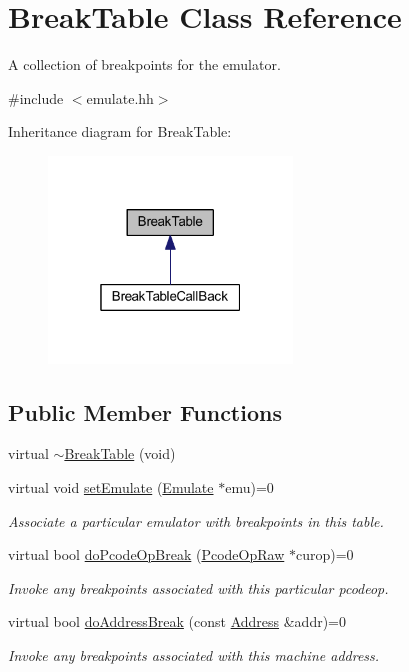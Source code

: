 \hypertarget{class_break_table}{}\section{Break\+Table Class Reference}
\label{class_break_table}


A collection of breakpoints for the emulator.  




{\ttfamily \#include $<$emulate.\+hh$>$}



Inheritance diagram for Break\+Table\+:
\nopagebreak
\begin{figure}[H]
\begin{center}
\leavevmode
\includegraphics[width=184pt]{class_break_table__inherit__graph}
\end{center}
\end{figure}
\subsection*{Public Member Functions}
\begin{DoxyCompactItemize}
\item 
virtual \mbox{\hyperlink{class_break_table_a26f7cfee65cdbe7666fa1554cead8fb3}{$\sim$\+Break\+Table}} (void)
\item 
virtual void \mbox{\hyperlink{class_break_table_a7efdfc549d576cf17235aa74bbf19a79}{set\+Emulate}} (\mbox{\hyperlink{class_emulate}{Emulate}} $\ast$emu)=0
\begin{DoxyCompactList}\small\item\em Associate a particular emulator with breakpoints in this table. \end{DoxyCompactList}\item 
virtual bool \mbox{\hyperlink{class_break_table_af8829327f29c768f834825fe40b54bad}{do\+Pcode\+Op\+Break}} (\mbox{\hyperlink{class_pcode_op_raw}{Pcode\+Op\+Raw}} $\ast$curop)=0
\begin{DoxyCompactList}\small\item\em Invoke any breakpoints associated with this particular pcodeop. \end{DoxyCompactList}\item 
virtual bool \mbox{\hyperlink{class_break_table_a7833a73318fadd483f73fbd33bdffd23}{do\+Address\+Break}} (const \mbox{\hyperlink{class_address}{Address}} \&addr)=0
\begin{DoxyCompactList}\small\item\em Invoke any breakpoints associated with this machine address. \end{DoxyCompactList}\end{DoxyCompactItemize}


